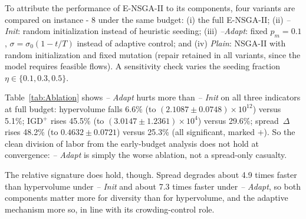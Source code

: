 \documentclass[11pt, a4paper]{article}
\begin{document}
To attribute the performance of E-NSGA-II to its components, four
variants are compared on instance - 8 under the same budget: (i) the full E-NSGA-II; (ii) \emph{--Init}: random initialization instead of heuristic seeding; (iii) \emph{--Adapt}: fixed $p_m = 0.1$, $\sigma = \sigma_0(1-t/T)$ instead of adaptive control; and (iv) \emph{Plain}: NSGA-II with random initialization and fixed mutation (repair retained in all variants, since the model requires feasible flows). A sensitivity check varies the seeding fraction $\eta \in \{0.1, 0.3, 0.5\}$.

\hypertarget{tab:Ablation}{}
\begin{table}[!htb]
\centering
\renewcommand{\arraystretch}{1.35}
\setlength{\tabcolsep}{8pt}
\caption{Ablation results on instance 8 (30 replications)}
\label{tab:Ablation}
\end{table}
\protect\hypertarget{tab:Ablation}{}{}

Table~\ref{tab:Ablation} shows \textit{-- Adapt} hurts more than \textit{-- Init} on all three indicators at full budget: hypervolume falls 6.6\% (to $(2.1087 \pm 0.0748)\times10^{12}$) versus 5.1\%; IGD$^+$ rises 45.5\% (to $(3.0147 \pm 1.2361)\times10^{4}$) versus 29.6\%; spread~$\Delta$ rises 48.2\% (to $0.4632 \pm 0.0721$) versus 25.3\% (all significant, marked $+$). So the clean division of labor from the early-budget analysis does not hold at convergence: \textit{-- Adapt} is simply the worse ablation, not a spread-only casualty.

The relative signature does hold, though. Spread degrades about 4.9 times faster than hypervolume under \textit{-- Init} and about 7.3 times faster under \textit{-- Adapt}, so both components matter more for diversity than for hypervolume, and the adaptive mechanism more so, in line with its crowding-control role.
\end{document}
